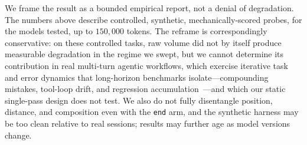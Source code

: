 \documentclass[11pt]{article}
\begin{document}
We frame the result as a bounded empirical report, not a denial of degradation. The numbers above describe controlled, synthetic, mechanically-scored probes, for the models tested, up to $150{,}000$ tokens. The reframe is correspondingly conservative: on these controlled tasks, raw volume did not by itself produce measurable degradation in the regime we swept, but we cannot determine its contribution in real multi-turn agentic workflows, which exercise iterative task and error dynamics that long-horizon benchmarks isolate---compounding mistakes, tool-loop drift, and regression accumulation~\cite{orlanski2026slopcodebench, deng2026evoclaw}---and which our static single-pass design does not test. We also do not fully disentangle position, distance, and composition even with the \texttt{end} arm, and the synthetic harness may be too clean relative to real sessions; results may further age as model versions change.
\end{document}
